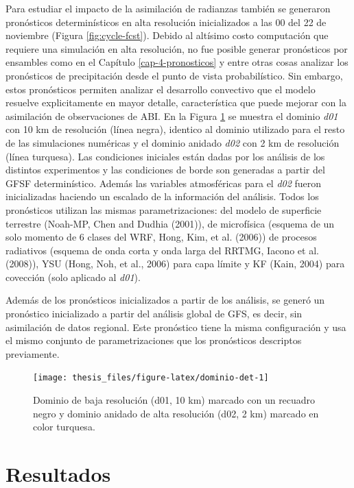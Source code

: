 \documentclass[12pt,oneside,a4paper]{reedthesis}
\begin{document}
Para estudiar el impacto de la asimilación de radianzas también se generaron pronósticos determinísticos en alta resolución inicializados a las 00 del 22 de noviembre (Figura \ref{fig:cycle-fcst}). Debido al altísimo costo computación que requiere una simulación en alta resolución, no fue posible generar pronósticos por ensambles como en el Capítulo \ref{cap-4-pronosticos} y entre otras cosas analizar los pronósticos de precipitación desde el punto de vista probabilístico. Sin embargo, estos pronósticos permiten analizar el desarrollo convectivo que el modelo resuelve explicitamente en mayor detalle, característica que puede mejorar con la asimilación de observaciones de ABI. En la Figura \ref{fig:dominio-det} se muestra el dominio \emph{d01} con 10 km de resolución (línea negra), identico al dominio utilizado para el resto de las simulaciones numéricas y el dominio anidado \emph{d02} con 2 km de resolución (línea turquesa). Las condiciones iniciales están dadas por los análisis de los distintos experimentos y las condiciones de borde son generadas a partir del GFSF determinístico. Además las variables atmosféricas para el \emph{d02} fueron inicializadas haciendo un escalado de la información del análisis. Todos los pronósticos utilizan las mismas parametrizaciones: del modelo de superficie terrestre (Noah-MP, Chen and Dudhia (2001)), de microfísica (esquema de un solo momento de 6 clases del WRF, Hong, Kim, et al. (2006)) de procesos radiativos (esquema de onda corta y onda larga del RRTMG, Iacono et al. (2008)), YSU (Hong, Noh, et al., 2006) para capa límite y KF (Kain, 2004) para covección (solo aplicado al \emph{d01}).

Además de los pronósticos inicializados a partir de los análisis, se generó un pronóstico inicializado a partir del análisis global de GFS, es decir, sin asimilación de datos regional. Este pronóstico tiene la misma configuración y usa el mismo conjunto de parametrizaciones que los pronósticos descriptos previamente.


\begin{figure}

{\centering \texttt{[image: thesis\_files/figure-latex/dominio-det-1]} 

}

\caption{Dominio de baja resolución (d01, 10 km) marcado con un recuadro negro y dominio anidado de alta resolución (d02, 2 km) marcado en color turquesa.}\label{fig:dominio-det}
\end{figure}
\hypertarget{resultados-2}{%
\section{Resultados}\label{resultados-2}}
\end{document}
